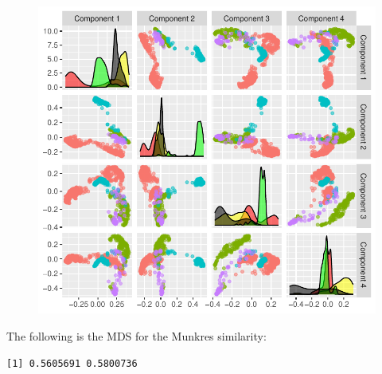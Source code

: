 \documentclass[
  letterpaper,
  DIV=11,
  numbers=noendperiod]{scrreprt}
\newenvironment{Shaded}{}{}
\newcommand{\AttributeTok}[1]{\textcolor[rgb]{0.78,0.47,0.87}{#1}}
\newcommand{\ConstantTok}[1]{\textcolor[rgb]{0.82,0.60,0.40}{#1}}
\newcommand{\DecValTok}[1]{\textcolor[rgb]{0.82,0.60,0.40}{#1}}
\newcommand{\DocumentationTok}[1]{\textcolor[rgb]{0.64,0.20,0.25}{#1}}
\newcommand{\FunctionTok}[1]{\textcolor[rgb]{0.38,0.69,0.94}{#1}}
\newcommand{\NormalTok}[1]{\textcolor[rgb]{0.67,0.70,0.75}{#1}}
\newcommand{\OtherTok}[1]{\textcolor[rgb]{0.15,0.68,0.38}{#1}}
\newcommand{\SpecialCharTok}[1]{\textcolor[rgb]{0.34,0.71,0.76}{#1}}
\begin{document}
\begin{figure}[H]

{\centering \includegraphics[width=1\textwidth,height=\textheight]{index_files/figure-pdf/unnamed-chunk-39-1.pdf}

}

\end{figure}

The following is the MDS for the Munkres similarity:

\begin{Shaded}
\end{Shaded}

\begin{verbatim}
[1] 0.5605691 0.5800736
\end{verbatim}
\end{document}
